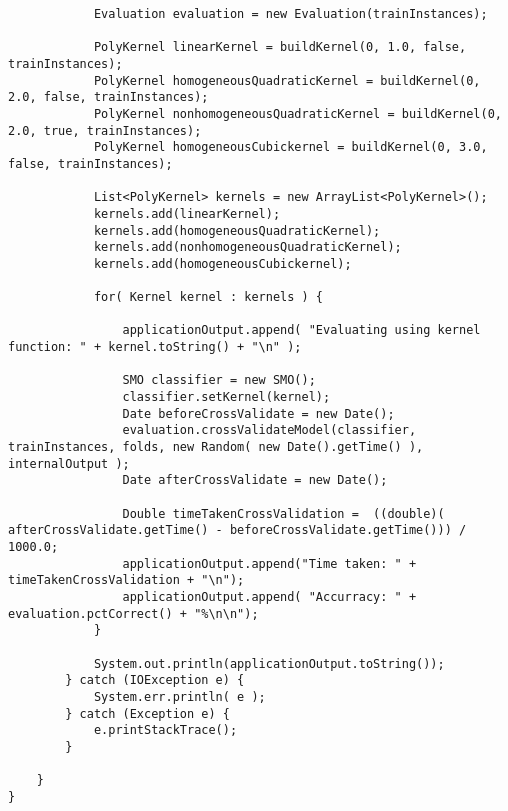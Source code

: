 \begin{lstlisting}
			Evaluation evaluation = new Evaluation(trainInstances);
			
			PolyKernel linearKernel = buildKernel(0, 1.0, false, trainInstances);
			PolyKernel homogeneousQuadraticKernel = buildKernel(0, 2.0, false, trainInstances);
			PolyKernel nonhomogeneousQuadraticKernel = buildKernel(0, 2.0, true, trainInstances);
			PolyKernel homogeneousCubickernel = buildKernel(0, 3.0, false, trainInstances);
			
			List<PolyKernel> kernels = new ArrayList<PolyKernel>();
			kernels.add(linearKernel);
			kernels.add(homogeneousQuadraticKernel);
			kernels.add(nonhomogeneousQuadraticKernel);
			kernels.add(homogeneousCubickernel);
			
			for( Kernel kernel : kernels ) {
				
				applicationOutput.append( "Evaluating using kernel function: " + kernel.toString() + "\n" );
				
				SMO classifier = new SMO();
				classifier.setKernel(kernel);
				Date beforeCrossValidate = new Date();
				evaluation.crossValidateModel(classifier, trainInstances, folds, new Random( new Date().getTime() ), internalOutput );
				Date afterCrossValidate = new Date();
				
				Double timeTakenCrossValidation =  ((double)( afterCrossValidate.getTime() - beforeCrossValidate.getTime())) / 1000.0;
				applicationOutput.append("Time taken: " + timeTakenCrossValidation + "\n");	
				applicationOutput.append( "Accurracy: " + evaluation.pctCorrect() + "%\n\n");
			}
			
			System.out.println(applicationOutput.toString());
		} catch (IOException e) {
			System.err.println( e );
		} catch (Exception e) {
			e.printStackTrace();
		}
			
	}
}
\end{lstlisting}




